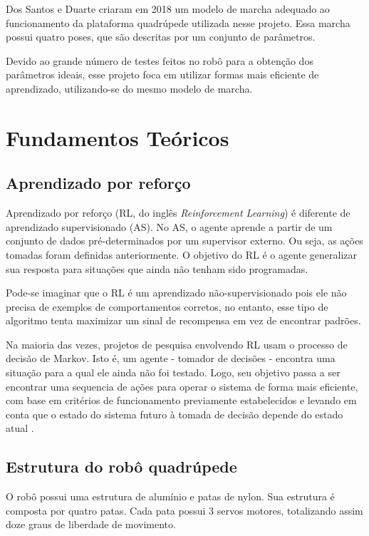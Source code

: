 \documentclass[12pt]{report}
\begin{document}
Dos Santos e Duarte \cite{2} criaram em 2018 um modelo de marcha adequado ao funcionamento da plataforma quadrúpede utilizada nesse projeto. Essa marcha possui quatro poses, que são descritas por um conjunto de parâmetros.

Devido ao grande número de testes feitos no robô para a obtenção dos parâmetros ideais, esse projeto foca em utilizar formas mais eficiente de aprendizado, utilizando-se do mesmo modelo de marcha.


\vspace*{-0.6cm}
\chapter*{Fundamentos Teóricos}

\vspace*{-0.75cm}
\section*{Aprendizado por reforço}

Aprendizado por reforço (RL, do inglês \textit{Reinforcement Learning}) é diferente de aprendizado supervisionado (AS). No AS, o agente aprende a partir de um conjunto de dados pré-determinados por um supervisor externo. Ou seja, as ações tomadas foram definidas anteriormente. O objetivo do RL é o agente generalizar sua resposta para situações que ainda não tenham sido programadas.

Pode-se imaginar que o RL é um aprendizado não-supervisionado pois ele não precisa de exemplos de comportamentos corretos, no entanto, esse tipo de algoritmo tenta maximizar um sinal de recompensa em vez de encontrar padrões.

Na maioria das vezes, projetos de pesquisa envolvendo RL usam o processo de decisão de Markov. Isto é, um agente - tomador de decisões - encontra uma situação para a qual ele ainda não foi testado. Logo, seu objetivo passa a ser encontrar uma sequencia de ações para operar o sistema de forma mais eficiente, com base em critérios de funcionamento previamente estabelecidos e levando em conta que o estado do sistema futuro à tomada de decisão depende do estado atual \cite{3}.

\section*{Estrutura do robô quadrúpede}

O robô possui uma estrutura de alumínio e patas de nylon. Sua estrutura é composta por quatro patas. Cada pata possui 3 servos motores, totalizando assim doze graus de liberdade de movimento.
\end{document}
